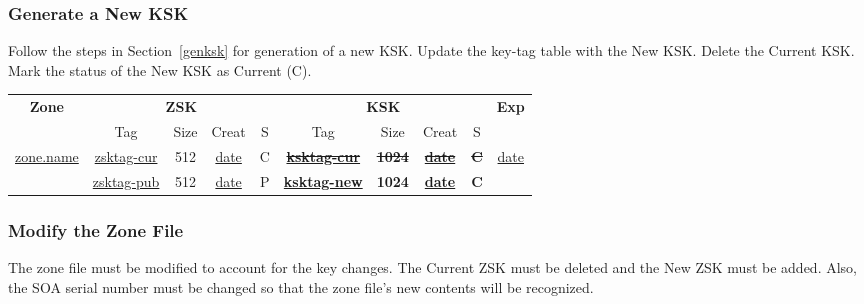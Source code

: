 
\subsubsection{Generate a New KSK}

Follow the steps in Section~\ref{genksk} for generation of a new KSK.  Update
the key-tag table with the New KSK.  Delete the Current KSK.  Mark the status
of the New KSK as Current (C).

\begin{center}
\begin{tabular}{|c|c|c|c|c|c|c|c|c|c|}
\hline
{\bf Zone} &
\multicolumn{4}{c|}{{\bf ZSK}} &
\multicolumn{4}{c|}{{\bf KSK}} &
{\bf Exp} \\
\cline{2-9}

 & Tag & Size & Creat & S & Tag & Size & Creat & S & \\
\hline

\underline{zone.name}				&
\underline{zsktag-cur}				&
512						&
\underline{date}				&
C						&
{\bf \sout{\underline{ksktag-cur}}}		&
{\bf \sout{1024}}				&
{\bf \sout{\underline{date}}}			&
{\bf \sout{C}}					&
\underline{date}				\\

\cline{2-9}

			&
\underline{zsktag-pub}	&
512			&
\underline{date}	&
P			&
{\bf \underline{ksktag-new}}		&
{\bf 1024}			&
{\bf \underline{date}}			&
{\bf C}			&
			\\

\hline
\end{tabular}
\end{center}


\subsubsection{Modify the Zone File}

The zone file must be modified to account for the key changes.  The Current
ZSK must be deleted and the New ZSK must be added.  Also, the SOA serial
number must be changed so that the zone file's new contents will be recognized.

